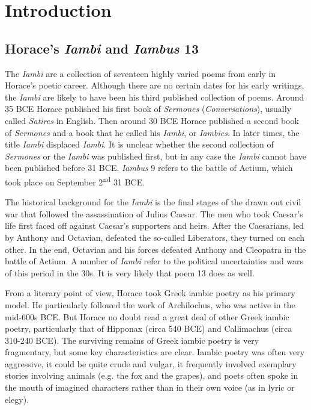 \chapter*{Introduction}

\section*{Horace's \textit{Iambi} and \textit{Iambus} 13}

The \textit{Iambi} are a collection of seventeen highly varied poems from early in Horace's poetic career.  Although there are no certain dates for his early writings, the \textit{Iambi} are likely to have been his third published collection of poems.  Around 35 BCE Horace published his first book of \textit{Sermones} (\textit{Conversations}), usually called \textit{Satires} in English.  Then around 30 BCE Horace published a second book of \textit{Sermones} and a book that he called his \textit{Iambi}, or \textit{Iambics}.  In later times, the title \textit{Iambi} displaced \textit{Iambi}.  It is unclear whether the second collection of \textit{Sermones} or the \textit{Iambi} was published first, but in any case the \textit{Iambi} cannot have been published before 31 BCE.  \textit{Iambus} 9 refers to the battle of Actium, which took place on September 2\textsuperscript{nd} 31 BCE.

The historical background for the \textit{Iambi} is the final stages of the drawn out civil war that followed the assassination of Julius Caesar.  The men who took Caesar's life first faced off against Caesar's supporters and heirs.  After the Caesarians, led by Anthony and Octavian, defeated the so-called Liberators, they turned on each other. In the end, Octavian and his forces defeated Anthony and Cleopatra in the battle of Actium.  A number of \textit{Iambi} refer to the political uncertainties and wars of this period in the 30s.  It is very likely that poem 13 does as well.

From a literary point of view, Horace took Greek iambic poetry as his primary model.  He particularly followed the work of Archilochus, who was active in the mid-600s BCE.  But Horace no doubt read a great deal of other Greek iambic poetry, particularly that of Hipponax (circa 540 BCE) and Callimachus (circa 310-240 BCE).  The surviving remains of Greek iambic poetry is very fragmentary, but some key characteristics are clear.  Iambic poetry was often very aggressive, it could be quite crude and vulgar, it frequently involved exemplary stories involving animals (e.g. the fox and the grapes), and poets often spoke in the mouth of imagined characters rather than in their own voice (as in lyric or elegy).


